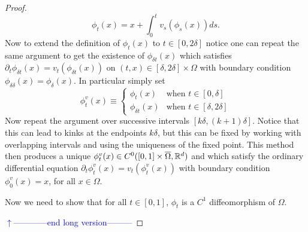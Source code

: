 \documentclass[noinfoline]{imsart}
\begin{document}
\begin{proof}
{\[ \phi_t(x) = x + \int_0^t v_s(\phi_s(x))ds. \]
Now to extend  the definition of $\phi_t(x)$ to $ t\in [0,2\delta]$ notice one can repeat the same argument to get the existence of $\phi_{\delta t}(x)$ which satisfies $\partial_t \phi_{\delta t}(x) = v_t(\phi_{\delta t}(x)) $ on $(t,x)\in [\delta,2\delta]\times\Omega$  with boundary condition $\phi_{\delta \delta}(x)=\phi_\delta(x)$.
In particular simply set
\begin{equation}
\phi_t^v(x)\equiv \begin{cases}
\phi_t(x) & \text{when $t\in[0,\delta]$}\\
\phi_{\delta t}(x) & \text{when $t\in[\delta,2\delta]$}
\end{cases}
\end{equation}
Now repeat the argument over successive intervals $[k\delta, (k+1) \delta]$. Notice that this can lead to kinks at the endpoints $k\delta$, but this can be fixed by working with overlapping intervals and using the uniqueness of the fixed point.
This method then produces a unique   $\phi_t^v(x)\in C^0 ([0,1]\times \overline \Omega,\Bbb R^d)$ and  which satisfy the ordinary differential equation $
 \partial_t \phi_t^v(x) = v_t(\phi_t^v(x)) $ with boundary condition $\phi_0^v(x)=x$, for all $x\in \Omega$.


Now we need to show that for all $t\in [0,1]$, $\phi_t$ is a $C^1$ diffeomorphism of $\Omega$.

{\flushleft\textcolor{blue}{$\uparrow$------------end long version---------}}\newline
} \fi


\end{proof}
\end{document}
